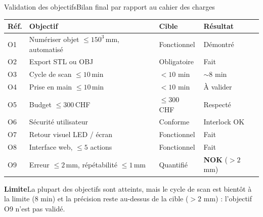 \documentclass[aspectratio=169,10pt]{beamer}
\newcommand{\limitbox}[1]{%
  \begin{beamercolorbox}[wd=\linewidth,sep=0.25cm,rounded=true]{}
    \colorbox{softred}{%
      \parbox{\dimexpr\linewidth-0.5cm\relax}{\textbf{\textcolor{heigred}{Limite}}\quad #1}%
    }
  \end{beamercolorbox}
}
\begin{document}
\begin{frame}[shrink=5]{Validation des objectifs}{Bilan final par rapport au cahier des charges}
  \small
  \begin{tabularx}{\linewidth}{@{}p{0.8cm}p{5.8cm}p{3.0cm}X@{}}
    \toprule
    \textbf{R\'{e}f.} & \textbf{Objectif} & \textbf{Cible} & \textbf{R\'{e}sultat} \\
    \midrule
    O1  & Num\'{e}riser objet $\leq 150^3$\,mm, automatis\'{e}  & Fonctionnel & D\'{e}montr\'{e} \\
    O2  & Export STL ou OBJ                              & Obligatoire & Fait \\
    O3  & Cycle de scan $\leq 10$\,min                   & $< 10$ min & $\sim$8 min \\
    O4  & Prise en main $\leq 10$\,min                   & $< 10$ min & \`{A} valider \\
    O5  & Budget $\leq 300$\,CHF                         & $\leq 300$ CHF & Respect\'{e} \\
    O6  & S\'{e}curit\'{e} utilisateur                         & Conforme & Interlock OK \\
    O7  & Retour visuel LED / \'{e}cran                     & Fonctionnel & Fait \\
    O8  & Interface web, $\leq 5$ actions                & Fonctionnel & Fait \\
    O9  & Erreur $\leq 2$\,mm, r\'{e}p\'{e}tabilit\'{e} $\leq 1$\,mm & Quantifi\'{e} & \textcolor{heigred}{\textbf{NOK}} ($>2$\,mm) \\
    \bottomrule
  \end{tabularx}

  \vspace{0.15cm}
  \limitbox{La plupart des objectifs sont atteints, mais le cycle de scan est bientôt à la limite (8 min) et la pr\'{e}cision reste au-dessus de la cible ($>2$ mm) : l'objectif O9 n'est pas valid\'{e}.}
\end{frame}
\end{document}
